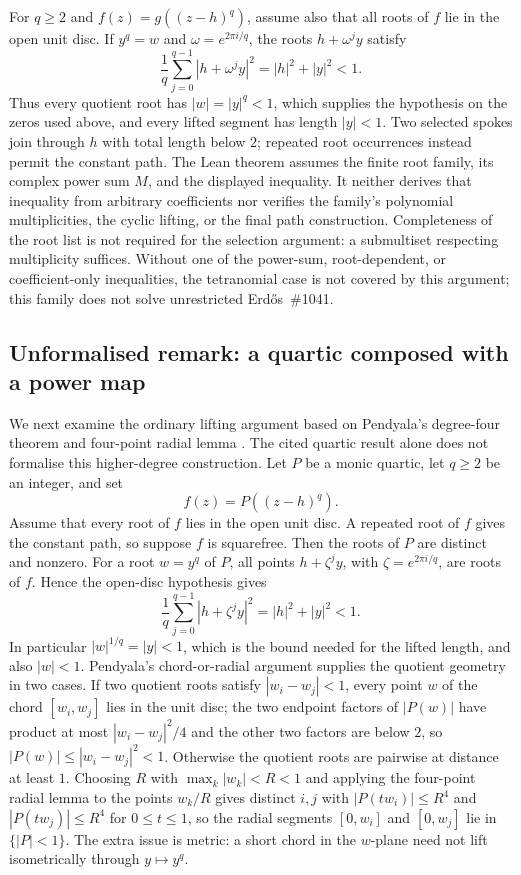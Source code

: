 For $q\ge2$ and $f(z)=g((z-h)^q)$, assume also that all roots of $f$
lie in the open unit disc. If $y^q=w$ and $\omega=e^{2\pi i/q}$, the
roots $h+\omega^j y$ satisfy
\[
 \frac1q\sum_{j=0}^{q-1}|h+\omega^j y|^2=|h|^2+|y|^2<1.
\]
Thus every quotient root has $|w|=|y|^q<1$, which supplies the
hypothesis on the zeros used above, and every lifted segment has length
$|y|<1$. Two selected spokes join through $h$ with total length below
$2$; repeated root occurrences instead permit the constant path.
The Lean theorem assumes the finite root family, its complex power sum $M$,
and the displayed inequality. It neither derives that inequality from
arbitrary coefficients nor verifies the family's polynomial
multiplicities, the cyclic lifting, or the final path construction.
Completeness of the root list is not required for the selection argument:
a submultiset respecting multiplicity suffices.  Without one of the power-sum, root-dependent, or coefficient-only
inequalities, the tetranomial case is not covered by this argument; this family does not solve
unrestricted Erd\H{o}s~\#1041.

\subsection*{Unformalised remark: a quartic composed with a power map}\label{sec:translated-quartic-quotient-fibres}

We next examine the ordinary lifting argument based on Pendyala's
degree-four theorem \cite[Theorem~1]{june2026} and four-point radial
lemma \cite[Lemma~1]{june2026}. The cited quartic result alone does not
formalise this higher-degree construction. Let $P$ be a monic quartic,
let $q\ge2$ be an integer, and set
\[
  f(z)=P((z-h)^q).
\]
Assume that every root of $f$ lies in the open unit disc.
A repeated root of $f$ gives the constant path, so suppose $f$ is
squarefree. Then the roots of $P$ are distinct and nonzero. For a root
$w=y^q$ of $P$, all points $h+\zeta^j y$, with $\zeta=e^{2\pi i/q}$,
are roots of $f$. Hence the open-disc hypothesis gives
\[
 \frac1q\sum_{j=0}^{q-1}|h+\zeta^jy|^2=|h|^2+|y|^2<1.
\]
In particular $|w|^{1/q}=|y|<1$, which is the bound needed for the
lifted length, and also $|w|<1$. Pendyala's chord-or-radial argument
supplies the quotient geometry in two cases.  If two quotient roots satisfy
$|w_i-w_j|<1$, every point $w$ of the chord $[w_i,w_j]$ lies in the unit disc;
the two endpoint factors of $|P(w)|$ have product at most $|w_i-w_j|^2/4$ and
the other two factors are below $2$, so $|P(w)|\le|w_i-w_j|^2<1$.  Otherwise
the quotient roots are pairwise at distance at least $1$.  Choosing $R$ with
$\max_k|w_k|<R<1$ and applying the four-point radial lemma to the points
$w_k/R$ gives distinct $i,j$ with $|P(tw_i)|\le R^4$ and $|P(tw_j)|\le R^4$ for
$0\le t\le1$, so the radial segments $[0,w_i]$ and $[0,w_j]$ lie in
$\{|P|<1\}$.  The extra issue is metric: a short chord in the
$w$-plane need not lift isometrically through $y\mapsto y^q$.

